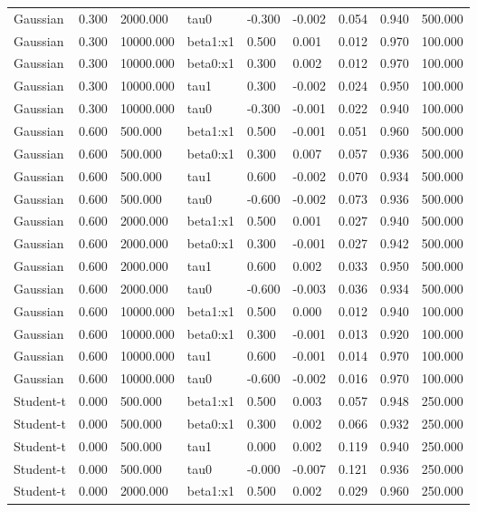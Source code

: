 \begin{table}[htbp]
\begin{tabular}{lllllllll}
Gaussian & 0.300 & 2000.000 & tau0 & -0.300 & -0.002 & 0.054 & 0.940 & 500.000 \\
Gaussian & 0.300 & 10000.000 & beta1:x1 & 0.500 & 0.001 & 0.012 & 0.970 & 100.000 \\
Gaussian & 0.300 & 10000.000 & beta0:x1 & 0.300 & 0.002 & 0.012 & 0.970 & 100.000 \\
Gaussian & 0.300 & 10000.000 & tau1 & 0.300 & -0.002 & 0.024 & 0.950 & 100.000 \\
Gaussian & 0.300 & 10000.000 & tau0 & -0.300 & -0.001 & 0.022 & 0.940 & 100.000 \\
Gaussian & 0.600 & 500.000 & beta1:x1 & 0.500 & -0.001 & 0.051 & 0.960 & 500.000 \\
Gaussian & 0.600 & 500.000 & beta0:x1 & 0.300 & 0.007 & 0.057 & 0.936 & 500.000 \\
Gaussian & 0.600 & 500.000 & tau1 & 0.600 & -0.002 & 0.070 & 0.934 & 500.000 \\
Gaussian & 0.600 & 500.000 & tau0 & -0.600 & -0.002 & 0.073 & 0.936 & 500.000 \\
Gaussian & 0.600 & 2000.000 & beta1:x1 & 0.500 & 0.001 & 0.027 & 0.940 & 500.000 \\
Gaussian & 0.600 & 2000.000 & beta0:x1 & 0.300 & -0.001 & 0.027 & 0.942 & 500.000 \\
Gaussian & 0.600 & 2000.000 & tau1 & 0.600 & 0.002 & 0.033 & 0.950 & 500.000 \\
Gaussian & 0.600 & 2000.000 & tau0 & -0.600 & -0.003 & 0.036 & 0.934 & 500.000 \\
Gaussian & 0.600 & 10000.000 & beta1:x1 & 0.500 & 0.000 & 0.012 & 0.940 & 100.000 \\
Gaussian & 0.600 & 10000.000 & beta0:x1 & 0.300 & -0.001 & 0.013 & 0.920 & 100.000 \\
Gaussian & 0.600 & 10000.000 & tau1 & 0.600 & -0.001 & 0.014 & 0.970 & 100.000 \\
Gaussian & 0.600 & 10000.000 & tau0 & -0.600 & -0.002 & 0.016 & 0.970 & 100.000 \\
Student-t & 0.000 & 500.000 & beta1:x1 & 0.500 & 0.003 & 0.057 & 0.948 & 250.000 \\
Student-t & 0.000 & 500.000 & beta0:x1 & 0.300 & 0.002 & 0.066 & 0.932 & 250.000 \\
Student-t & 0.000 & 500.000 & tau1 & 0.000 & 0.002 & 0.119 & 0.940 & 250.000 \\
Student-t & 0.000 & 500.000 & tau0 & -0.000 & -0.007 & 0.121 & 0.936 & 250.000 \\
Student-t & 0.000 & 2000.000 & beta1:x1 & 0.500 & 0.002 & 0.029 & 0.960 & 250.000 \\

\end{tabular}
\end{table}
